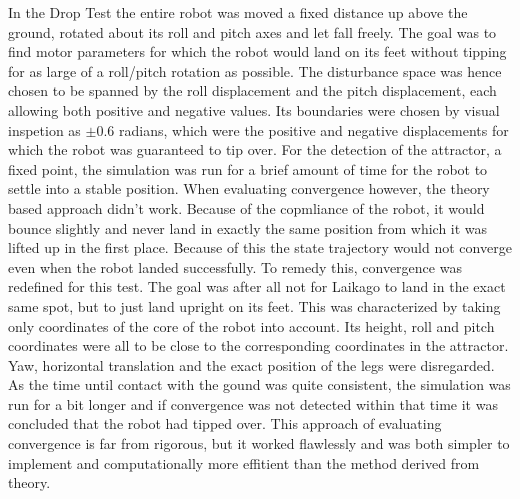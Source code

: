     In the Drop Test the entire robot was moved a fixed distance up above the ground, rotated about its roll and pitch axes and let fall freely. The goal was to find motor parameters for which the robot would land on its feet without tipping for as large of a roll/pitch rotation as possible. The disturbance space was hence chosen to be spanned by the roll displacement and the pitch displacement, each allowing both positive and negative values. Its boundaries were chosen by visual inspetion as $\pm 0.6$ radians, which were the positive and negative displacements for which the robot was guaranteed to tip over. For the detection of the attractor, a fixed point, the simulation was run for a brief amount of time for the robot to settle into a stable position. When evaluating convergence however, the theory based approach didn't work. Because of the copmliance of the robot, it would bounce slightly and never land in exactly the same position from which it was lifted up in the first place. Because of this the state trajectory would not converge even when the robot landed successfully. To remedy this, convergence was redefined for this test. The goal was after all not for Laikago to land in the exact same spot, but to just land upright on its feet. This was characterized by taking only coordinates of the core of the robot into account. Its height, roll and pitch coordinates were all to be close to the corresponding coordinates in the attractor. Yaw, horizontal translation and the exact position of the legs were disregarded.
    As the time until contact with the gound was quite consistent, the simulation was run for a bit longer and if convergence was not detected within that time it was concluded that the robot had tipped over. This approach of evaluating convergence is far from rigorous, but it worked flawlessly and was both simpler to implement and computationally more effitient than the method derived from theory. 

